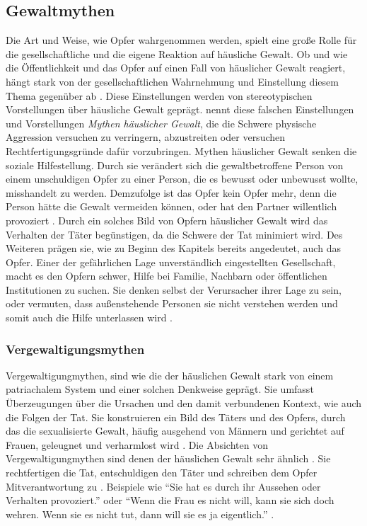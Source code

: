 \subsection{Gewaltmythen}   \label{subsec_2.1.3}
Die Art und Weise, wie Opfer wahrgenommen werden, spielt eine große Rolle für die gesellschaftliche und die eigene Reaktion auf häusliche Gewalt. Ob und wie die Öffentlichkeit und das Opfer auf einen Fall von häuslicher Gewalt reagiert, hängt stark von der gesellschaftlichen Wahrnehmung und Einstellung diesem Thema gegenüber ab \parencite{Labelingtheory_plus}. Diese Einstellungen werden von stereotypischen Vorstellungen über häusliche Gewalt geprägt. \textcite{DVMAS_Peters} nennt diese falschen Einstellungen und Vorstellungen \textit{Mythen häuslicher Gewalt}, die die Schwere physische Aggression versuchen zu verringern, abzustreiten oder versuchen Rechtfertigungsgründe dafür vorzubringen. Mythen häuslicher Gewalt senken die soziale Hilfestellung. Durch sie verändert sich die gewaltbetroffene Person von einem unschuldigen Opfer zu einer Person, die es bewusst oder unbewusst wollte, misshandelt zu werden. Demzufolge ist das Opfer kein Opfer mehr, denn die Person hätte die Gewalt vermeiden können, oder hat den Partner willentlich provoziert \parencite{DVMAS_Peters}. Durch ein solches Bild von Opfern häuslicher Gewalt wird das Verhalten der Täter begünstigen, da die Schwere der Tat minimiert wird. Des Weiteren prägen sie, wie zu Beginn des Kapitels bereits angedeutet, auch das Opfer. Einer der gefährlichen Lage unverständlich eingestellten Gesellschaft, macht es den Opfern schwer, Hilfe bei Familie, Nachbarn oder öffentlichen Institutionen zu suchen. Sie denken selbst der Verursacher ihrer Lage zu sein, oder vermuten, dass außenstehende Personen sie nicht verstehen werden und somit auch die Hilfe unterlassen wird \parencite{Gewaltmythen}.

\subsubsection{Vergewaltigungsmythen}  \label{2.1.3.1}
Vergewaltigungmythen, sind wie die der häuslichen Gewalt stark von einem patriachalem System und einer solchen Denkweise geprägt. Sie umfasst Überzeugungen über die Ursachen und den damit verbundenen Kontext, wie auch die Folgen der Tat. Sie konstruieren ein Bild des Täters und des Opfers, durch das die sexualisierte Gewalt, häufig ausgehend von Männern und gerichtet auf Frauen, geleugnet und verharmlost wird \parencite{Vergewaltigung_Bohner_1996}. Die Absichten von Vergewaltigungmythen sind denen der häuslichen Gewalt sehr ähnlich \parencite{DVMAS_Peters}. Sie rechtfertigen die Tat, entschuldigen den Täter und schreiben dem Opfer Mitverantwortung zu \parencite{Vergewaltigung_Boris_2004}. Beispiele wie \enquote{Sie hat es durch ihr Aussehen oder Verhalten provoziert.} oder \enquote{Wenn die Frau es nicht will, kann sie sich doch wehren. Wenn sie es nicht tut, dann will sie es ja eigentlich.} \parencite{Vergewaltigung_Boris_2004}.

